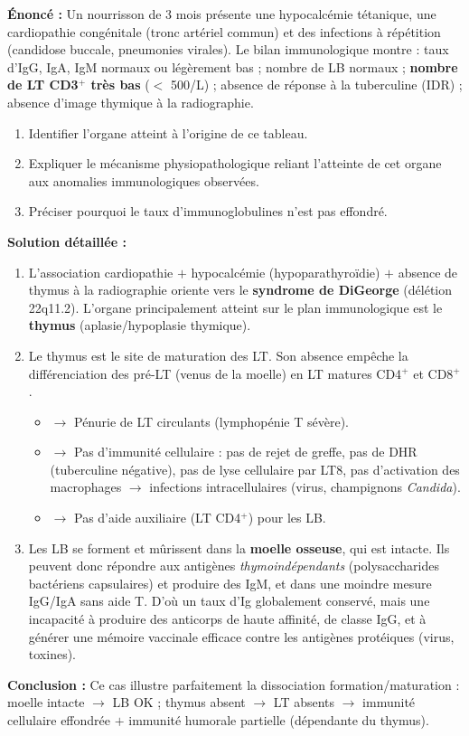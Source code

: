 \documentclass[11pt]{article}
\begin{document}
\begin{exoresolu}
\textbf{Énoncé :} Un nourrisson de 3 mois présente une hypocalcémie tétanique, une cardiopathie congénitale (tronc artériel commun) et des infections à répétition (candidose buccale, pneumonies virales). Le bilan immunologique montre : taux d'IgG, IgA, IgM normaux ou légèrement bas ; nombre de LB normaux ; \textbf{nombre de LT CD3$^+$ très bas} ($<$ 500/\textmu L) ; absence de réponse à la tuberculine (IDR) ; absence d'image thymique à la radiographie.
\begin{enumerate}
    \item Identifier l'organe atteint à l'origine de ce tableau.
    \item Expliquer le mécanisme physiopathologique reliant l'atteinte de cet organe aux anomalies immunologiques observées.
    \item Préciser pourquoi le taux d'immunoglobulines n'est pas effondré.
\end{enumerate}
\tcblower
\textbf{Solution détaillée :}
\begin{enumerate}
    \item L'association cardiopathie $+$ hypocalcémie (hypoparathyroïdie) $+$ absence de thymus à la radiographie oriente vers le \textbf{syndrome de DiGeorge} (délétion 22q11.2). L'organe principalement atteint sur le plan immunologique est le \textbf{thymus} (aplasie/hypoplasie thymique).
    \item Le thymus est le site de maturation des LT. Son absence empêche la différenciation des pré-LT (venus de la moelle) en LT matures CD4$^+$ et CD8$^+$.
    \begin{itemize}
        \item $\rightarrow$ Pénurie de LT circulants (lymphopénie T sévère).
        \item $\rightarrow$ Pas d'immunité cellulaire : pas de rejet de greffe, pas de DHR (tuberculine négative), pas de lyse cellulaire par LT8, pas d'activation des macrophages $\rightarrow$ infections intracellulaires (virus, champignons \emph{Candida}).
        \item $\rightarrow$ Pas d'aide auxiliaire (LT CD4$^+$) pour les LB.
    \end{itemize}
    \item Les LB se forment et mûrissent dans la \textbf{moelle osseuse}, qui est intacte. Ils peuvent donc répondre aux antigènes \emph{thymoindépendants} (polysaccharides bactériens capsulaires) et produire des IgM, et dans une moindre mesure IgG/IgA sans aide T. D'où un taux d'Ig globalement conservé, mais une incapacité à produire des anticorps de haute affinité, de classe IgG, et à générer une mémoire vaccinale efficace contre les antigènes protéiques (virus, toxines).
\end{enumerate}
\textbf{Conclusion :} Ce cas illustre parfaitement la dissociation formation/maturation : moelle intacte $\rightarrow$ LB OK ; thymus absent $\rightarrow$ LT absents $\rightarrow$ immunité cellulaire effondrée $+$ immunité humorale partielle (dépendante du thymus).
\end{exoresolu}
\end{document}

